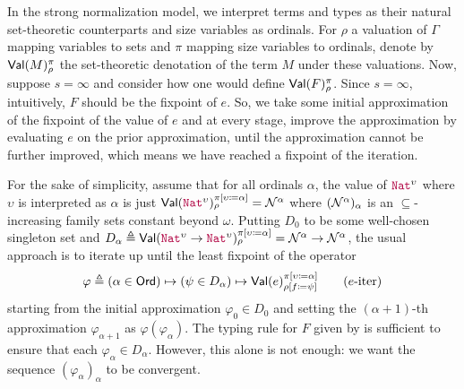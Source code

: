 In the strong normalization model, we interpret terms and types as
their natural set-theoretic counterparts and size variables as
ordinals.
%
For $\rho$ a valuation of $\Gamma$ mapping variables to sets and $\pi$
mapping size variables to ordinals, denote by $\textsf{Val}(M)_\rho^\pi$ the
set-theoretic denotation of the term $M$ under these valuations.
%
Now, suppose $s=\infty$ and consider how one would define
$\textsf{Val}(F)_\rho^\pi$.
%
Since $s=\infty$, intuitively, $F$ should be the fixpoint of $e$.
%
So, we take some initial approximation of the fixpoint of the value of
$e$ and at every stage, improve the approximation by evaluating $e$ on
the prior approximation, until the approximation cannot be further
improved, which means we have reached a fixpoint of the iteration.

For the sake of simplicity, assume that for all ordinals $\alpha$, the
value of $\Nat^\upsilon$ where $\upsilon$ is interpreted as $\alpha$
is just
$\Val(\Nat^\upsilon)_\rho^{\subst{\pi}{\upsilon}{\alpha}} =
\McN^\alpha$ where $(\mathcal{N}^\alpha)_\alpha$ is an $\subseteq$-increasing
family sets constant beyond $\omega$.
%
Putting $D_0$ to be some well-chosen singleton set and
$D_\alpha \triangleq \Val(\Nat^\upsilon \to
\Nat^\upsilon)_\rho^{\subst{\pi}{\upsilon}{\alpha}} = \McN^\alpha \to
\McN^\alpha$, the usual approach is to iterate up until the least
fixpoint of the operator
%
\begin{align*}
  \varphi \triangleq
  (\alpha \in \Ord) \mapsto (\psi \in D_\alpha) \mapsto \Val(e)_{\subst{\rho}{f}{\psi}}^{\subst{\pi}{\upsilon}{\alpha}}
  \tag{$e$-iter}\label{eqn:e-iter}
\end{align*}
%
starting from the initial approximation $\varphi_0 \in D_0$ and
setting the $(\alpha+1)$-th approximation $\varphi_{\alpha+1}$ as
$\varphi(\varphi_\alpha)$.
%
The typing rule for $F$ given by  is sufficient
to ensure that each $\varphi_\alpha \in D_\alpha$.
%
However, this alone is not enough: we want the sequence
$(\varphi_\alpha)_\alpha$ to be convergent.

